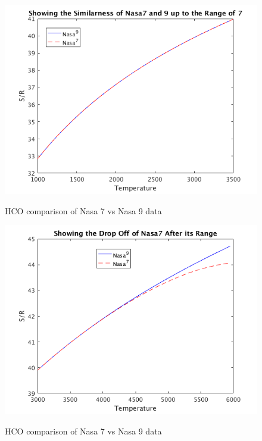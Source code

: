 \documentclass{article}
\begin{document}
\begin{figure}
  \centering
  \includegraphics[width=\textwidth]{S2.png}
  \label{fig:S2}
  \caption{HCO comparison of Nasa 7 vs Nasa 9 data}
\end{figure}


\begin{figure}
  \centering
  \includegraphics[width=\textwidth]{S3.png}
  \label{fig:S3}
  \caption{HCO comparison of Nasa 7 vs Nasa 9 data}
\end{figure}
\end{document}

